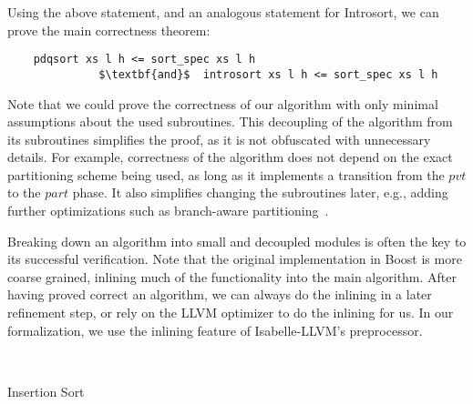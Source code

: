 \documentclass[runningheads]{llncs}
\begin{document}
  Using the above statement, and an analogous statement for Introsort, we can prove the main correctness theorem:
  \begin{theorem}\label{thm:sorting_correct}
  \begin{lstlisting}
    pdqsort xs l h <= sort_spec xs l h
              $\textbf{and}$  introsort xs l h <= sort_spec xs l h
  \end{lstlisting}
  \end{theorem}


  Note that we could prove the correctness of our algorithm with only minimal assumptions about the used subroutines.
  This decoupling of the algorithm from its subroutines simplifies the proof, as it is not obfuscated with unnecessary details.
  For example, correctness of the algorithm does not depend on the exact partitioning scheme being used, as long as it implements
  a transition from the \is$pvt$ to the \is$part$ phase. It also simplifies changing the subroutines later, e.g.,
  adding further optimizations such as branch-aware partitioning~\cite{EdWe16}.

  Breaking down an algorithm into small and decoupled modules is often the key to its successful verification.
  Note that the original implementation in Boost is more coarse grained, inlining much of the functionality into the main algorithm.
  After having proved correct an algorithm, we can always do the inlining in a later refinement step, or rely on the LLVM optimizer to do
  the inlining for us. In our formalization, we use the inlining feature of Isabelle-LLVM's preprocessor.

  \begin{algorithm}
  \begin{minipage}{.41\textwidth}
  \begin{algorithmic}[1]
      ~\Return\EndIf
      \EndWhile
    \EndProcedure
  \end{algorithmic}
  \end{minipage}\hfill
  \begin{minipage}{.52\textwidth}
  \begin{algorithmic}[1]
       \label{alg:insert:loophead}
      \EndWhile
    \EndProcedure
  \end{algorithmic}
  \end{minipage}
  \caption{Insertion Sort}\label{alg:insort}
  \end{algorithm}
%
\end{document}
